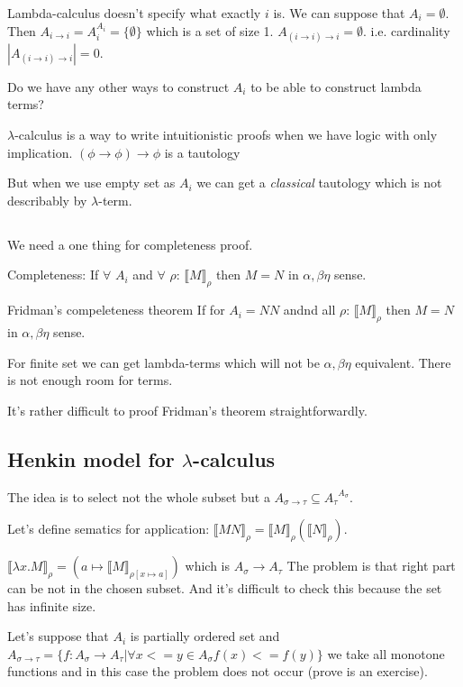 \documentclass[a4paper,10pt]{book}
\newcommand{\sem}[2]{ \llbracket#1\rrbracket_{#2} }
\begin{document}
Lambda-calculus doesn't specify what exactly $i$ is. We can suppose that $A_i=\emptyset$. Then
$A_{i\rightarrow i} = A_i^{A_i} = \{ \emptyset \}$ which is a set of size 1. $A_{(i\rightarrow i)\rightarrow i} = { \emptyset }$. i.e. cardinality $|A_{(i\rightarrow i)\rightarrow i} | = 0 $.

Do we have any other ways to construct $A_i$ to be able to construct lambda terms?

$\lambda$-calculus is a way to write intuitionistic proofs when we have logic with only implication. 
 $(\phi \rightarrow \phi)\rightarrow \phi$ is a tautology

But when we use empty set as $A_i$ we can get a \textit{classical} tautology which is not describably by $\lambda$-term.

\subsection{}
We need a one thing for completeness proof.

Completeness: If $\forall$ $A_i$ and $\forall$ $\rho$: $\sem{M}{\rho}$ then $M=N$ in 
$\alpha,\beta\eta$ sense.

Fridman's compeleteness theorem
If for $A_i=NN$ andnd all $\rho$: $\sem{M}{\rho}$ then $M=N$ in 
$\alpha,\beta\eta$ sense.

For finite set we can get lambda-terms which will not be $\alpha,\beta\eta$ equivalent. There is not enough room for terms.

It's rather difficult to proof Fridman's theorem straightforwardly.

\subsection{Henkin model for $\lambda$-calculus}
The idea is to select not the whole subset but a $A_{\sigma \rightarrow \tau} \subseteq {A_\tau}^{A_\sigma}$.

Let's define sematics for application:
$\sem{MN}{\rho} = \sem{M}{\rho}(\sem{N}{\rho})$.

$\sem{\lambda x . M}{\rho} = (a \mapsto \sem{M}{\rho[x \mapsto a]})$ which is $A_\sigma \rightarrow A_\tau$
The problem is that right part can be not in the chosen subset. And it's difficult to check this because the 
set has infinite size.

Let's suppose that $A_i$ is partially ordered set and
$A_{\sigma \rightarrow \tau} = \{ f: A_\sigma \rightarrow A_\tau | 
\forall x <= y \in A_\sigma f(x) <= f(y)\}$
we take all monotone functions and in this case the problem does not occur (prove is an exercise).
\end{document}
